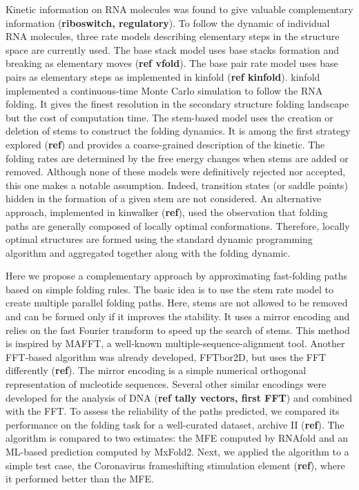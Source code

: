 \documentclass[a4paper,12pt]{article}
\begin{document}
Kinetic information on RNA molecules was found to give valuable complementary
information (\textbf{riboswitch, regulatory}). To follow the dynamic of individual RNA
molecules, three rate models describing elementary steps in the structure space
are currently used. The base stack model uses base stacks formation and breaking
as elementary moves (\textbf{ref vfold}). The base pair rate model uses base pairs as
elementary steps as implemented in kinfold (\textbf{ref kinfold}). kinfold implemented
a continuous-time Monte Carlo simulation to follow the RNA folding. It gives the
finest resolution in the secondary structure folding landscape but the cost of
computation time. The stem-based model uses the creation or deletion of stems to
construct the folding dynamics. It is among the first strategy explored (\textbf{ref})
and provides a coarse-grained description of the kinetic. The folding rates are
determined by the free energy changes when stems are added or removed. Although
none of these models were definitively rejected nor accepted, this one makes a
notable assumption. Indeed, transition states (or saddle points) hidden in the
formation of a given stem are not considered. An alternative approach,
implemented in kinwalker (\textbf{ref}), used the observation that folding paths are
generally composed of locally optimal conformations. Therefore, locally optimal
structures are formed using the standard dynamic programming algorithm and
aggregated together along with the folding dynamic.

Here we propose a complementary approach by approximating fast-folding paths
based on simple folding rules. The basic idea is to use the stem rate model to
create multiple parallel folding paths. Here, stems are not allowed to be
removed and can be formed only if it improves the stability. It uses a mirror
encoding and relies on the fast Fourier transform to speed up the search of
stems. This method is inspired by MAFFT, a well-known
multiple-sequence-alignment tool. Another FFT-based algorithm was already
developed, FFTbor2D, but uses the FFT differently (\textbf{ref}). The mirror encoding
is a simple numerical orthogonal representation of nucleotide sequences. Several
other similar encodings were developed for the analysis of DNA (\textbf{ref tally
vectors, first FFT}) and combined with the FFT. To assess the reliability of the
paths predicted, we compared its performance on the folding task for a
well-curated dataset, archive II (\textbf{ref}). The algorithm is compared to two
estimates: the MFE computed by RNAfold and an ML-based prediction computed by
MxFold2. Next, we applied the algorithm to a simple test case, the Coronavirus
frameshifting stimulation element (\textbf{ref}), where it performed better than the
MFE.
\end{document}
